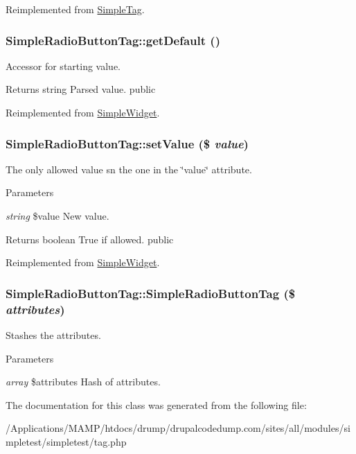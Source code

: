 Reimplemented from \hyperlink{class_simple_tag_a158fcbf8b82e7a6f7b6855c1dbe0715b}{SimpleTag}.\hypertarget{class_simple_radio_button_tag_ac6c12af9e40ad20addeecb398e92f95d}{
\subsubsection[{getDefault}]{\setlength{\rightskip}{0pt plus 5cm}SimpleRadioButtonTag::getDefault ()}}
\label{class_simple_radio_button_tag_ac6c12af9e40ad20addeecb398e92f95d}
Accessor for starting value. \begin{DoxyReturn}{Returns}
string Parsed value.  public 
\end{DoxyReturn}


Reimplemented from \hyperlink{class_simple_widget_a9c0702cdfee1237b1599cb920ce14ba6}{SimpleWidget}.\hypertarget{class_simple_radio_button_tag_a501c46e35c07e6d509aff9576eeda833}{
\subsubsection[{setValue}]{\setlength{\rightskip}{0pt plus 5cm}SimpleRadioButtonTag::setValue (\$ {\em value})}}
\label{class_simple_radio_button_tag_a501c46e35c07e6d509aff9576eeda833}
The only allowed value sn the one in the \char`\"{}value\char`\"{} attribute. 
\begin{DoxyParams}{Parameters}
\item[{\em string}]\$value New value. \end{DoxyParams}
\begin{DoxyReturn}{Returns}
boolean True if allowed.  public 
\end{DoxyReturn}


Reimplemented from \hyperlink{class_simple_widget_a9e048a450e2d29a601e672deda9fa869}{SimpleWidget}.\hypertarget{class_simple_radio_button_tag_a82658eec3537173c26d57441bc0e5d47}{
\subsubsection[{SimpleRadioButtonTag}]{\setlength{\rightskip}{0pt plus 5cm}SimpleRadioButtonTag::SimpleRadioButtonTag (\$ {\em attributes})}}
\label{class_simple_radio_button_tag_a82658eec3537173c26d57441bc0e5d47}
Stashes the attributes. 
\begin{DoxyParams}{Parameters}
\item[{\em array}]\$attributes Hash of attributes. \end{DoxyParams}


The documentation for this class was generated from the following file:\begin{DoxyCompactItemize}
\item 
/Applications/MAMP/htdocs/drump/drupalcodedump.com/sites/all/modules/simpletest/simpletest/tag.php\end{DoxyCompactItemize}
